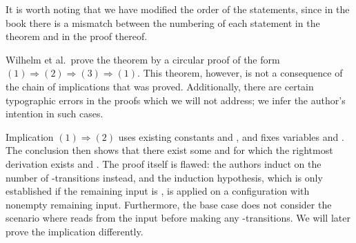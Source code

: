 \begin{isabellebody}
\begin{isamarkuptext}
It is worth noting that we have modified the order of the statements, since in the book there
is a mismatch between the numbering of each statement in the theorem and in the proof thereof.

Wilhelm et al.\ prove the theorem by a circular proof of the form
$(1) \Longrightarrow (2) \Longrightarrow (3) \Longrightarrow (1)$. This 
theorem, however, is not a consequence of the chain of implications that was proved. Additionally,
there are certain typographic errors in the proofs which we will not address; we infer the author's
intention in such cases.

Implication $(1) \Longrightarrow (2)$ uses existing constants  and , and fixes variables \isa{{\isasymgamma}} and
. The conclusion then shows that there exist some  and
 for which the rightmost derivation exists and \isa{\isafree{{\isasymgamma}}\ {\isacharequal}{\kern0pt}\ \isafree{{\isasymgamma}{\isacharprime}{\kern0pt}}\ {\isacharat}{\kern0pt}\ \isafree{{\isasymalpha}}}. The proof itself
is flawed: the authors induct on the number of \isa{{\isasymepsilon}}-transitions instead, and the 
induction hypothesis, which is only established if the remaining input is \isa{{\isacharbrackleft}{\kern0pt}{\isacharbrackright}{\kern0pt}}, is
applied on a configuration with nonempty remaining input. Furthermore, the base case does not consider 
the scenario where  reads  from the input before making any \isa{{\isasymepsilon}}-transitions. 
We will later prove the implication differently. 


\end{isamarkuptext}
\end{isabellebody}
